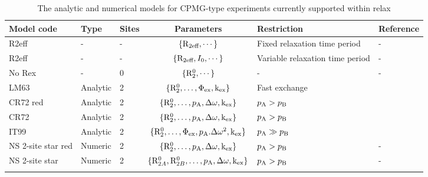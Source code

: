 \begin{table}
\begin{center}
\caption{The analytic and numerical models for CPMG-type experiments currently supported within relax}
\begin{tabular}{lllcll}
\toprule
Model code         & Type     & Sites & Parameters                                        & Restriction                       & Reference \\
\midrule                              
R2eff              & -        & -     & $\{\mathrm{R}_{2\textrm{eff}}, \cdots\}$                            & Fixed relaxation time period      & - \\
R2eff              & -        & -     & $\{\mathrm{R}_{2\textrm{eff}}, I_0, \cdots\}$                       & Variable relaxation time period   & - \\
No Rex             & -        & 0     & $\{\mathrm{R}_2^0, \cdots\}$                           & -                                 & - \\
LM63               & Analytic & 2     & $\{\mathrm{R}_2^0, \dots, \Phi_\textrm{ex}, \textrm{k}_\textrm{ex}\}$              & Fast exchange                     & \citet{LuzMeiboom63} \\
CR72 red           & Analytic & 2     & $\{\mathrm{R}_2^0, \dots, p_\textrm{A}, \Delta\omega, \textrm{k}_\textrm{ex}\}$            & $p_\textrm{A} > p_\textrm{B}$                       & \citet{CarverRichards72} \\
CR72               & Analytic & 2     & $\{\mathrm{R}_2^0, \dots, p_\textrm{A}, \Delta\omega, \textrm{k}_\textrm{ex}\}$            & $p_\textrm{A} > p_\textrm{B}$                       & \citet{CarverRichards72} \\
IT99               & Analytic & 2     & $\{\mathrm{R}_2^0, \dots, \Phi_\textrm{ex}, p_\textrm{A}.\Delta\omega^2, \textrm{k}_\textrm{ex}\}$   & $p_\textrm{A} \gg p_\textrm{B}$                     & \citet{IshimaTorchia99} \\
NS 2-site star red & Numeric  & 2     & $\{\mathrm{R}_2^0, \dots, p_\textrm{A}, \Delta\omega, \textrm{k}_\textrm{ex}\}$            & $p_\textrm{A} > p_\textrm{B}$                       & - \\
NS 2-site star     & Numeric  & 2     & $\{\mathrm{R}_{2A}^0, \mathrm{R}_{2B}^0, \dots, p_\textrm{A}, \Delta\omega, \textrm{k}_\textrm{ex}\}$ & $p_\textrm{A} > p_\textrm{B}$                     & - \\
\bottomrule
\label{table: CPMG dispersion models}
\end{tabular}
\end{center}
\end{table}


